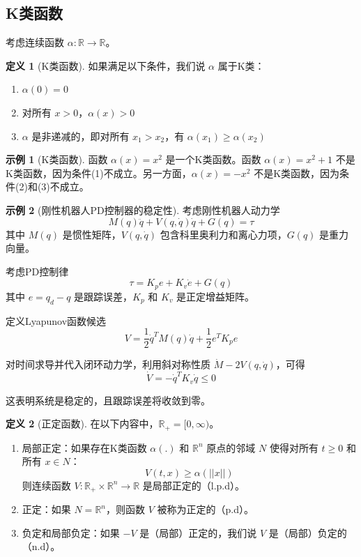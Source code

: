 \documentclass[UTF8,12pt,a4paper]{ctexart}
\theoremstyle{definition}
\newtheorem{definition}{定义}[section]
\newtheorem{example}{示例}[section]
\begin{document}
\subsection{K类函数}

考虑连续函数 $\alpha: \mathbb{R} \rightarrow \mathbb{R}$。

\begin{definition}[K类函数]
如果满足以下条件，我们说 $\alpha$ 属于K类：
\begin{enumerate}
\item $\alpha(0) = 0$
\item 对所有 $x > 0$，$\alpha(x) > 0$
\item $\alpha$ 是非递减的，即对所有 $x_1 > x_2$，有 $\alpha(x_1) \geq \alpha(x_2)$
\end{enumerate}
\end{definition}

\begin{example}[K类函数]
函数 $\alpha(x)=x^2$ 是一个K类函数。函数 $\alpha(x)=x^2+1$ 不是K类函数，因为条件(1)不成立。另一方面，$\alpha(x)=-x^2$ 不是K类函数，因为条件(2)和(3)不成立。
\end{example}

\begin{example}[刚性机器人PD控制器的稳定性]
考虑刚性机器人动力学
\[
M(q)\ddot{q} + V(q, \dot{q})\dot{q} + G(q) = \tau
\]
其中 $M(q)$ 是惯性矩阵，$V(q, \dot{q})$ 包含科里奥利力和离心力项，$G(q)$ 是重力向量。

考虑PD控制律
\[
\tau = K_p e + K_v \dot{e} + G(q)
\]
其中 $e = q_d - q$ 是跟踪误差，$K_p$ 和 $K_v$ 是正定增益矩阵。

定义Lyapunov函数候选
\[
V = \frac{1}{2}\dot{q}^T M(q) \dot{q} + \frac{1}{2}e^T K_p e
\]

对时间求导并代入闭环动力学，利用斜对称性质 $\dot{M} - 2V(q, \dot{q})$，可得
\[
\dot{V} = -\dot{q}^T K_v \dot{q} \leq 0
\]

这表明系统是稳定的，且跟踪误差将收敛到零。
\end{example}

\begin{definition}[正定函数]
在以下内容中，$\mathbb{R}_+ = [0, \infty)$。
\begin{enumerate}
\item 局部正定：如果存在K类函数 $\alpha(.)$ 和 $\mathbb{R}^n$ 原点的邻域 $N$ 使得对所有 $t \geq 0$ 和所有 $x \in N$：
\[
V(t, x) \geq \alpha(||x||)
\]
则连续函数 $V: \mathbb{R}_+ \times \mathbb{R}^n \rightarrow \mathbb{R}$ 是局部正定的（l.p.d）。

\item 正定：如果 $N=\mathbb{R}^n$，则函数 $V$ 被称为正定的（p.d）。

\item 负定和局部负定：如果 $-V$ 是（局部）正定的，我们说 $V$ 是（局部）负定的（n.d）。
\end{enumerate}
\end{definition}
\end{document}
